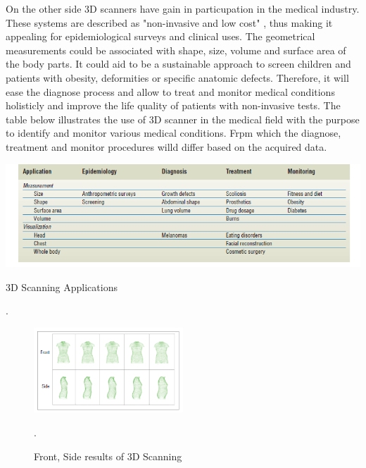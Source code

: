 \documentclass[12pt]{report}
\begin{document}
On the other side 3D scanners have gain in particupation in the medical industry. These systems are described as "non-invasive and low cost" , thus making it appealing for epidemiological surveys and clinical uses. 
The geometrical measurements could be associated with shape, size, volume and surface area of the body parts. It could aid to be a sustainable approach to screen children and patients with obesity, deformities or specific anatomic defects. 
Therefore, it will ease the diagnose process and allow to treat and monitor medical conditions holisticly and improve the life quality of patients with non-invasive tests.
The table below illustrates the use of 3D scanner in the medical field with the purpose to identify and monitor various medical conditions. 
Frpm which the diagnose, treatment and monitor procedures willd differ based on the acquired data.
\begin{table}[ht]
    \centering
    \includegraphics[width=15cm]{table1.png}
    \caption{3D Scanning Applications}\cite[]{treleaven_wells_2007}.
\end{table}

\begin{figure}[h]
  \begin{center}
  \includegraphics[width=0.5\textwidth]{bodyMedicine.png}
  \caption{Front, Side results of 3D Scanning }\cite[]{treleaven_wells_2007}.
  \label{bodymed}
\end{center}
\end{figure}
\end{document}
